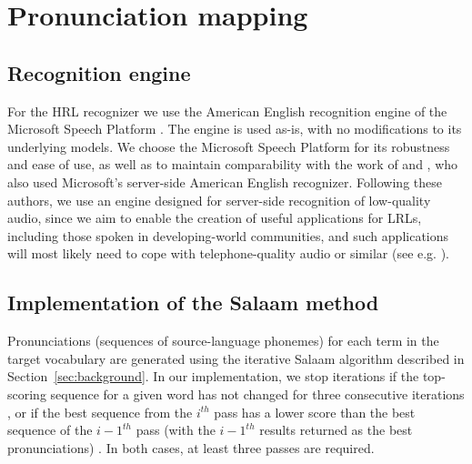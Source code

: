 \documentclass[11pt]{article}
\begin{document}


\section{Pronunciation mapping}
\label{sec:backend}

\subsection{Recognition engine}
\label{sec:engine}
For the HRL recognizer
we use the American English recognition engine 
of the Microsoft Speech Platform \cite{mspsdk}. 
The engine is used as-is, with no modifications to its underlying models. 
We choose the Microsoft Speech Platform for its robustness and ease of use, as well as to maintain comparability with the work of  and , who also used Microsoft's server-side American English recognizer. 
Following these authors, we use an engine designed for server-side recognition of low-quality audio, since we aim to enable the creation of useful applications for LRLs, including those spoken in developing-world communities, and such applications will most likely need to cope with telephone-quality audio or similar (see e.g. ).



\subsection{Implementation of the Salaam method}
\label{sec:implementation}

Pronunciations (sequences of source-language phonemes) for each term in the target vocabulary are generated using the iterative Salaam algorithm %
described in Section~\ref{sec:background}. In our implementation, 
we stop iterations
if the top-scoring sequence for a given word has not changed for three consecutive iterations \cite{Chan12}, or 
if the best sequence from the $i^{th}$ pass has a lower score than the best sequence of the ${i - 1}^{th}$ pass (with the ${i - 1}^{th}$ results returned as the best pronunciations) \cite{Qiao10}. In both cases, at least three passes are required. 
\end{document}
